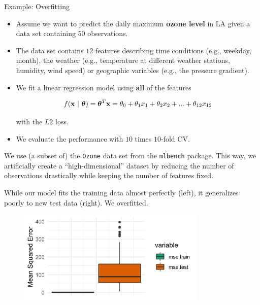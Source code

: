 \documentclass[11pt,compress,t,notes=noshow, xcolor=table]{beamer}
\begin{document}
\begin{vbframe}{Example: Overfitting}

\begin{itemize}
\item Assume we want to predict the daily maximum \textbf{ozone level} in LA given a data set containing $50$ observations.
\item The data set contains $12$ features describing time conditions (e.g., weekday, month),
the weather (e.g., temperature at different weather stations, humidity, wind speed) or geographic variables (e.g., the pressure gradient).
\item We fit a linear regression model using \textbf{all} of the features

$$
f(\mathbf{x} ~|~ \bm{\theta}) = \bm{\theta}^T\mathbf{x} = \theta_0 + \theta_1 x_1 + \theta_2 x_2 + ... + \theta_{12} x_{12}
$$

with the $L2$ loss.

\item We evaluate the performance with $10$ times $10$-fold CV.

\end{itemize}

\vfill

\begin{footnotesize} 
We use (a subset of) the \texttt{Ozone} data set from the \texttt{mlbench} package. This way, we artificially create a \enquote{high-dimensional} dataset by reducing the number of observations drastically while keeping the number of features fixed. 
\end{footnotesize}

\framebreak 


While our model fits the training data almost perfectly (left), it generalizes poorly
to new test data (right). We overfitted.

\lz 

\begin{figure}
\includegraphics[width=0.8\textwidth]{figure/ozone_mse_boxplot.png}\\
\end{figure}

\end{vbframe}
\end{document}
